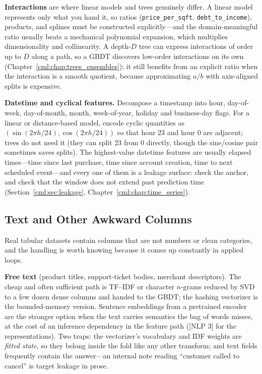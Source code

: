 \textbf{Interactions} are where linear models and trees genuinely differ. A linear model represents only what you hand it, so ratios (\texttt{price\_per\_sqft}, \texttt{debt\_to\_income}), products, and splines must be constructed explicitly---and the domain-meaningful ratio usually beats a mechanical polynomial expansion, which multiplies dimensionality and collinearity. A depth-$D$ tree can express interactions of order up to $D$ along a path, so a GBDT discovers low-order interactions on its own (Chapter~\ref{cml:chap:trees_ensembles}); it still benefits from an explicit ratio when the interaction is a smooth quotient, because approximating $a/b$ with axis-aligned splits is expensive.

\textbf{Datetime and cyclical features.} Decompose a timestamp into hour, day-of-week, day-of-month, month, week-of-year, holiday and business-day flags. For a linear or distance-based model, encode cyclic quantities as $(\sin(2\pi h/24), \cos(2\pi h/24))$ so that hour 23 and hour 0 are adjacent; trees do not need it (they can split 23 from 0 directly, though the sine/cosine pair sometimes saves splits). The highest-value datetime features are usually elapsed times---time since last purchase, time since account creation, time to next scheduled event---and every one of them is a leakage surface: check the anchor, and check that the window does not extend past prediction time (Section~\ref{cml:sec:leakage}, Chapter~\ref{cml:chap:time_series}).

\subsection{Text and Other Awkward Columns}

Real tabular datasets contain columns that are not numbers or clean categories, and the handling is worth knowing because it comes up constantly in applied loops.

\textbf{Free text} (product titles, support-ticket bodies, merchant descriptors). The cheap and often sufficient path is TF--IDF or character $n$-grams reduced by SVD to a few dozen dense columns and handed to the GBDT; the hashing vectorizer is the bounded-memory version. Sentence embeddings from a pretrained encoder are the stronger option when the text carries semantics the bag of words misses, at the cost of an inference dependency in the feature path ([NLP 3] for the representations). Two traps: the vectorizer's vocabulary and IDF weights are \emph{fitted state}, so they belong inside the fold like any other transform; and text fields frequently contain the answer---an internal note reading ``customer called to cancel'' is target leakage in prose.

